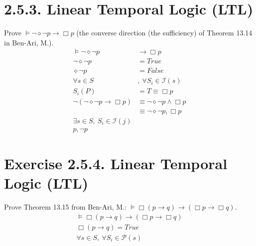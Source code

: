 \documentclass{article}
\begin{document}
\section*{2.5.3. Linear Temporal Logic (LTL)}
Prove $\models \neg \diamond \neg p \rightarrow \Box p$ (the converse direction (the sufficiency) of Theorem 13.14 in Ben-Ari, M.).
\begin{align*}
    \models \neg \diamond \neg p &\rightarrow \Box p\\
    \neg \diamond \neg p &= True\\
    \diamond \neg p &= False\\
    \forall s \in S&,\ \forall S_{i} \in \mathscr{I}(s)\\
    S_{i}(P) &= T \equiv \Box p\\
    \neg(\neg \diamond \neg p \rightarrow \Box p) &\equiv \neg \diamond \neg p \wedge \Box p\\
    &\equiv \neg \diamond \neg p, \Box p\\
    \exists s \in S,\ S_{i} \in \mathscr{I}(j)\\
    p, \neg p
\end{align*}
\section*{Exercise 2.5.4. Linear Temporal Logic (LTL)}
Prove Theorem 13.15 from Ben-Ari, M.:  $\models \Box (p \rightarrow q) \rightarrow (\Box p \rightarrow \Box q)$.
\begin{align*}
    \models \Box (p \rightarrow q) \rightarrow (\Box p \rightarrow \Box q)\\
    \Box (p \rightarrow q) = True\\
    \forall s \in S,\ \forall S_{i} \in \mathscr{P}(s)\\
\end{align*}
\end{document}

